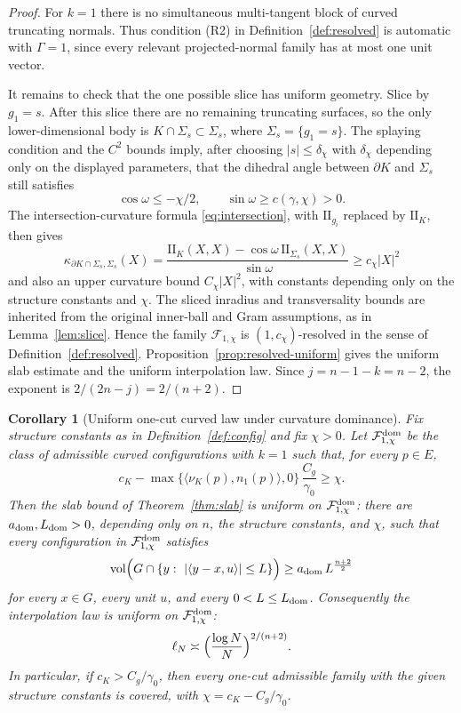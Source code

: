 \documentclass[11pt]{article}
\newtheorem{corollary}[theorem]{Corollary}
\newcommand{\vol}{\operatorname{vol}}
\begin{document}
\begin{proof}
For \(k=1\) there is no simultaneous multi-tangent block of curved truncating
normals.  Thus condition (R2) in Definition~\ref{def:resolved} is automatic
with \(\Gamma=1\), since every relevant projected-normal family has at most one
unit vector.

It remains to check that the one possible slice has uniform geometry.  Slice by
\(g_1=s\).  After this slice there are no remaining truncating surfaces, so the
only lower-dimensional body is \(K\cap\Sigma_s\subset\Sigma_s\), where
\(\Sigma_s=\{g_1=s\}\).  The splaying condition and the \(C^2\) bounds imply,
after choosing \(|s|\le\delta_\chi\) with \(\delta_\chi\) depending only on the
displayed parameters, that the dihedral angle between \(\partial K\) and
\(\Sigma_s\) still satisfies
\[
  \cos\omega\le-\chi/2,\qquad \sin\omega\ge c(\gamma,\chi)>0 .
\]
The intersection-curvature formula \eqref{eq:intersection}, with
\(\mathrm{I\!I}_{g_i}\) replaced by \(\mathrm{I\!I}_K\), then gives
\[
  \kappa_{\partial K\cap\Sigma_s,\Sigma_s}(X)
  =
  \frac{\mathrm{I\!I}_K(X,X)-\cos\omega\,\mathrm{I\!I}_{\Sigma_s}(X,X)}
       {\sin\omega}
  \ge c_\chi |X|^2
\]
and also an upper curvature bound \(C_\chi |X|^2\), with constants depending
only on the structure constants and \(\chi\).  The sliced inradius and
transversality bounds are inherited from the original inner-ball and Gram
assumptions, as in Lemma~\ref{lem:slice}.  Hence the family
\(\mathcal F_{1,\chi}\) is \((1,c_\chi)\)-resolved in the sense of
Definition~\ref{def:resolved}.  Proposition~\ref{prop:resolved-uniform} gives
the uniform slab estimate and the uniform interpolation law.  Since
\(j=n-1-k=n-2\), the exponent is \(2/(2n-j)=2/(n+2)\).
\end{proof}

\begin{corollary}[Uniform one-cut curved law under curvature dominance]
\label{cor:onecut-curvdom}
Fix structure constants as in Definition~\ref{def:config} and fix
\(\chi>0\).  Let \(\mathcal F^{\rm dom}_{1,\chi}\) be the class of admissible
curved configurations with \(k=1\) such that, for every \(p\in E\),
\[
  c_K-\max\{\langle\nu_K(p),n_1(p)\rangle,0\}\,\frac{C_g}{\gamma_0}\ge\chi .
\]
Then the slab bound of Theorem~\ref{thm:slab} is uniform on
\(\mathcal F^{\rm dom}_{1,\chi}\): there are \(a_{\rm dom},L_{\rm dom}>0\),
depending only on \(n\), the structure constants, and \(\chi\), such that every
configuration in \(\mathcal F^{\rm dom}_{1,\chi}\) satisfies
\[
\vol\Bigl(G\cap\{y:\ |\langle y-x,u\rangle|\le L\}\Bigr)
\ge a_{\rm dom}\,L^{\frac{n+2}2}
\]
for every \(x\in G\), every unit \(u\), and every \(0<L\le L_{\rm dom}\).
Consequently the interpolation law is uniform on
\(\mathcal F^{\rm dom}_{1,\chi}\):
\[
  \ell_N\asymp\Bigl(\frac{\log N}{N}\Bigr)^{2/(n+2)}.
\]
In particular, if \(c_K>C_g/\gamma_0\), then every one-cut admissible family
with the given structure constants is covered, with
\(\chi=c_K-C_g/\gamma_0\).
\end{corollary}
\end{document}
